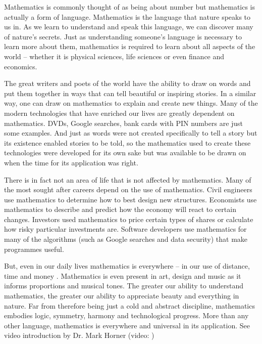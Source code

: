{ \Large
Mathematics is commonly thought of as being about number but mathematics is actually a form of
language. Mathematics is the language that nature speaks to us in. As we learn to understand and speak
this language, we can discover many of nature’s secrets. Just as understanding someone’s language is
necessary to learn more about them, mathematics is required to learn about all aspects of the world –
whether it is physical sciences, life sciences or even finance and economics.\par


The great writers and poets of the world have the ability to draw on words and put them together in
ways that can tell beautiful or inspiring stories. In a similar way, one can draw on mathematics to
explain and create new things. Many of the modern technologies that have enriched our lives are
greatly dependent on mathematics. DVDs, Google searches, bank cards with PIN numbers are just
some examples. And just as words were not created specifically to tell a story but its existence enabled
stories to be told, so the mathematics used to create these technologies were developed for its own sake
but was available to be drawn on when the time for its application was right.\par


There is in fact not an area of life that is not affected by mathematics. Many of the most sought after
careers depend on the use of mathematics. Civil engineers use mathematics to determine how to best
design new structures. Economists use mathematics to describe and predict how the economy will react
to certain changes. Investors used mathematics to price certain types of shares or calculate how risky
particular investments are. Software developers use mathematics for many of the algorithms (such as
Google searches and data security) that make programmes useful.\par



But, even in our daily lives mathematics is everywhere – in our use of distance, time and money .
Mathematics is even present in art, design and music as it informs proportions and musical tones. The
greater our ability to understand mathematics, the greater our ability to appreciate beauty and
everything in nature. Far from therefore being just a cold and abstract discipline, mathematics
embodies logic, symmetry, harmony and technological progress. More than any other language,
mathematics is everywhere and universal in its application.
See video introduction by Dr. Mark Horner (video: )\par

}





